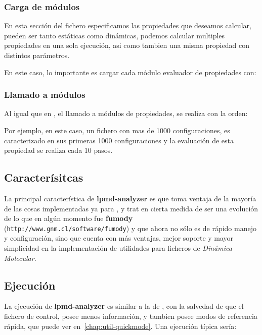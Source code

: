 \subsubsection{Carga de m\'odulos}
En esta secci\'on del fichero especificamos las propiedades que deseamos calcular, pueden ser tanto est\'aticas como din\'amicas, podemos calcular multiples propiedades en una sola ejecuci\'on, asi como tambien una misma propiedad con distintos par\'ametros.

En este caso, lo importante es cargar cada m\'odulo evaluador de propiedades con:

\subsubsection{Llamado a m\'odulos}
Al igual que en \lpmd, el llamado a m\'odulos de propiedades, se realiza con la orden:


Por ejemplo, en este caso, un fichero con mas de 1000 configuraciones, es caracterizado en sus primeras 1000 configuraciones y la evaluaci\'on de esta propiedad se realiza cada 10 pasos.

\subsection{Caracter\'isitcas}

La principal caracter\'istica de \textbf{lpmd-analyzer} es que toma ventaja de la mayor\'ia de las cosas implementadas ya para \lpmd, y trat en cierta medida de ser una evoluci\'on de lo que en alg\'un momento fue \textbf{fumody} (\texttt{http://www.gnm.cl/software/fumody}) y que ahora no s\'olo es de r\'apido manejo y configuraci\'on, sino que cuenta con m\'as ventajas, mejor soporte y mayor simplicidad en la implementaci\'on de utilidades para ficheros de \textit{Din\'amica Molecular}.

\subsection{Ejecuci\'on}

La ejecuci\'on de \textbf{lpmd-analyzer} es similar a la de \lpmd, con la salvedad de que el fichero de control, posee menos informaci\'on, y tambien posee modos de referencia r\'apida, que puede ver en~\ref{chap:util-quickmode}. Una ejecuci\'on t\'ipica ser\'ia:

